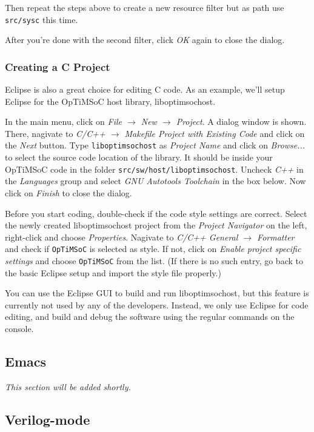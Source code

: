 Then repeat the steps above to create a new resource filter but as path
use \verb|src/sysc| this time.

After you're done with the second filter, click \emph{OK} again to
close the dialog.

\subsubsection{Creating a C Project}

Eclipse is also a great choice for editing C code. As an example, we'll setup
Eclipse for the OpTiMSoC host library, liboptimsochost.

In the main menu, click on \emph{File $\rightarrow$ New $\rightarrow$ Project}.
A dialog window is shown. There, nagivate to \emph{C/C++ $\rightarrow$ Makefile
Project with Existing Code} and click on the \emph{Next} button. Type
\verb|liboptimsochost| as \emph{Project Name} and click on \emph{Browse...} to
select the source code location of the library. It should be inside your
OpTiMSoC code in the folder \verb|src/sw/host/liboptimsochost|. Uncheck
\emph{C++} in the \emph{Languages} group and select \emph{GNU Autotools
Toolchain} in the box below. Now click on \emph{Finish} to close the dialog.

Before you start coding, double-check if the code style settings are correct.
Select the newly created liboptimsochost project from the \emph{Project
Navigator} on the left, right-click and choose \emph{Properties}. Nagivate to
\emph{C/C++ General $\rightarrow$ Formatter} and check if \verb|OpTiMSoC| is
selected as style. If not, click on \emph{Enable project specific settings} and
choose \verb|OpTiMSoC| from the list. (If there is no such entry, go back to the
basic Eclipse setup and import the style file properly.)

You can use the Eclipse GUI to build and run liboptimsochost, but this feature
is currently not used by any of the developers. Instead, we only use Eclipse
for code editing, and build and debug the software using the regular commands
on the console.


\subsection{Emacs}
\emph{This section will be added shortly.}

\subsection{Verilog-mode}

